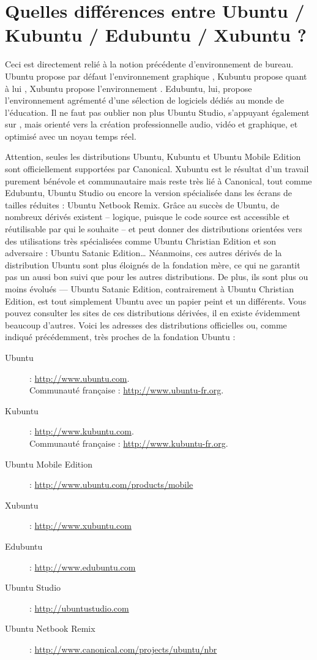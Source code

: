 \section{Quelles différences entre Ubuntu / Kubuntu / Edubuntu / Xubuntu ?}
Ceci est directement relié à la notion précédente d'environnement de bureau. Ubuntu propose par défaut l'environnement graphique , Kubuntu propose quant à lui , Xubuntu propose l'environnement . Edubuntu, lui, propose l'environnement  agrémenté d'une sélection de logiciels dédiés au monde de l'éducation. Il ne faut pas oublier non plus Ubuntu Studio, s'appuyant également sur , mais orienté vers la création professionnelle audio, vidéo et graphique, et optimisé avec un noyau temps réel.\par
Attention, seules les distributions Ubuntu, Kubuntu et Ubuntu Mobile Edition sont officiellement supportées par Canonical. Xubuntu est le résultat d'un travail purement bénévole et communautaire mais reste très lié à Canonical, tout comme Edubuntu, Ubuntu Studio ou encore la version spécialisée dans les écrans de tailles réduites : Ubuntu Netbook Remix. Grâce au succès de Ubuntu, de nombreux dérivés existent -- logique, puisque le code source est accessible et réutilisable par qui le souhaite -- et peut donner des distributions orientées vers des utilisations très spécialisées comme Ubuntu Christian Edition et son adversaire : Ubuntu Satanic Edition\ldots{} Néanmoins, ces autres dérivés de la distribution Ubuntu sont plus éloignés de la fondation mère, ce qui ne garantit pas un aussi bon suivi que pour les autres distributions. De plus, ils sont plus ou moins évolués --- Ubuntu Satanic Edition, contrairement à Ubuntu Christian Edition, est tout simplement Ubuntu avec un papier peint et un  différents. Vous pouvez consulter les sites de ces distributions dérivées, il en existe évidemment beaucoup d'autres. Voici les adresses des distributions officielles ou, comme indiqué précédemment, très proches de la fondation Ubuntu :
\begin{description}
\item [Ubuntu] : \url{http://www.ubuntu.com}.\\Communauté française : \url{http://www.ubuntu-fr.org}.
\item [Kubuntu] : \url{http://www.kubuntu.com}.\\Communauté française : \url{http://www.kubuntu-fr.org}. 
\item [Ubuntu Mobile Edition] : \url{http://www.ubuntu.com/products/mobile}
\item [Xubuntu] : \url{http://www.xubuntu.com}
\item [Edubuntu] : \url{http://www.edubuntu.com}
\item [Ubuntu Studio] : \url{http://ubuntustudio.com}
\item [Ubuntu Netbook Remix] : \url{http://www.canonical.com/projects/ubuntu/nbr}
\end{description}
